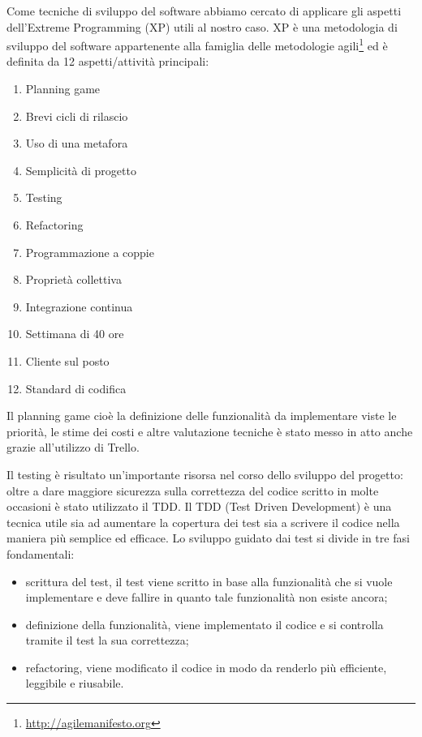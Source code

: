 \documentclass[12pt]{report}
\begin{document}
Come tecniche di sviluppo del software abbiamo cercato di applicare gli aspetti dell'Extreme Programming (XP)\cite{XP} utili al nostro caso. XP è una metodologia di sviluppo del software appartenente alla famiglia delle metodologie agili\footnote{\url{http://agilemanifesto.org}} ed è definita da 12 aspetti/attività principali:
\begin{enumerate}
\item Planning game
\item Brevi cicli di rilascio
\item Uso di una metafora
\item Semplicità di progetto
\item Testing
\item Refactoring
\item Programmazione a coppie 
\item Proprietà collettiva 
\item Integrazione continua
\item Settimana di 40 ore
\item Cliente sul posto
\item Standard di codifica
\end{enumerate}

Il planning game cioè la definizione delle funzionalità da implementare viste le priorità, le stime dei costi e altre valutazione tecniche è stato messo in atto anche grazie all'utilizzo di Trello. 

Il testing è risultato un'importante risorsa nel corso dello sviluppo del progetto: oltre a dare maggiore sicurezza sulla correttezza del codice scritto in molte occasioni è stato utilizzato il TDD. Il TDD (Test Driven Development) è una tecnica utile sia ad aumentare la copertura dei test sia a scrivere il codice nella maniera più semplice ed efficace. Lo sviluppo guidato dai test si divide in tre fasi fondamentali:
\begin{itemize}
\item scrittura del test, il test viene scritto in base alla funzionalità che si vuole implementare e deve fallire in quanto tale funzionalità non esiste ancora;
\item definizione della funzionalità, viene implementato il codice e si controlla tramite il test la sua correttezza;
\item refactoring, viene modificato il codice in modo da renderlo più efficiente, leggibile e riusabile.
\end{itemize}
\end{document}
